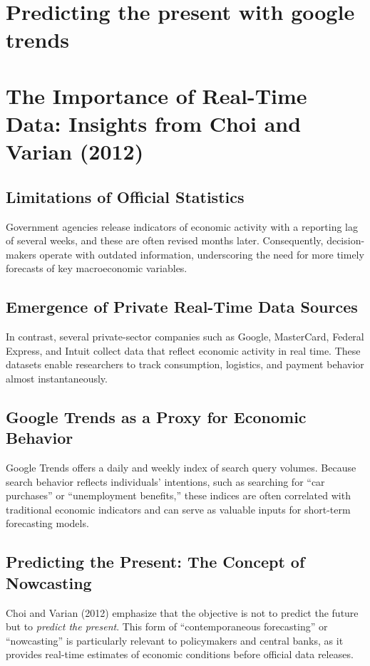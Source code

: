 \documentclass{article}
\begin{document}
\section{Predicting the present with google trends}
\section{The Importance of Real-Time Data: Insights from Choi and Varian (2012)}

\subsection{Limitations of Official Statistics}
Government agencies release indicators of economic activity with a reporting lag of several weeks, and these are often revised months later. Consequently, decision-makers operate with outdated information, underscoring the need for more timely forecasts of key macroeconomic variables.

\subsection{Emergence of Private Real-Time Data Sources}
In contrast, several private-sector companies such as Google, MasterCard, Federal Express, and Intuit collect data that reflect economic activity in real time. These datasets enable researchers to track consumption, logistics, and payment behavior almost instantaneously.

\subsection{Google Trends as a Proxy for Economic Behavior}
Google Trends offers a daily and weekly index of search query volumes. Because search behavior reflects individuals’ intentions, such as searching for ``car purchases'' or ``unemployment benefits,'' these indices are often correlated with traditional economic indicators and can serve as valuable inputs for short-term forecasting models.

\subsection{Predicting the Present: The Concept of Nowcasting}
Choi and Varian (2012) emphasize that the objective is not to predict the future but to \textit{predict the present}. This form of ``contemporaneous forecasting'' or ``nowcasting'' is particularly relevant to policymakers and central banks, as it provides real-time estimates of economic conditions before official data releases.
\end{document}
